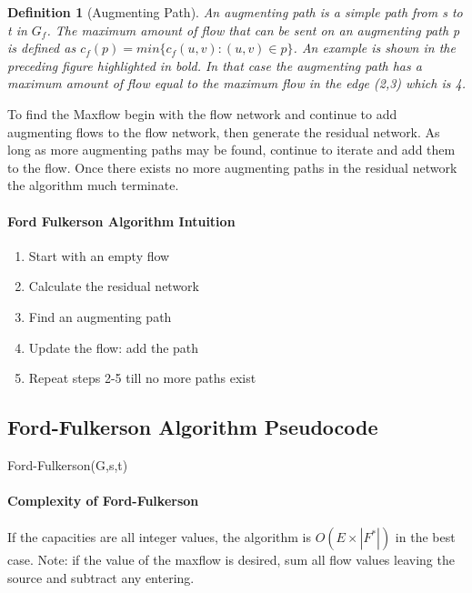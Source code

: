 \documentclass[12pt,letterpaper]{article}
\newtheorem{definition}{Definition}[section]
\begin{document}
\FloatBarrier
\begin{definition}[Augmenting Path]
An augmenting path is a simple path from s to t in $G_f$. The maximum amount of flow that can be sent on an augmenting path p is defined as $c_f(p)=min\{c_f(u,v):(u,v)\in p\}$. An example is shown in the preceding figure highlighted in bold. In that case the augmenting path has a maximum amount of flow equal to the maximum flow in the edge (2,3) which is 4.
\end{definition}
To find the Maxflow begin with the flow network and continue to add augmenting flows to the flow network, then generate the residual network. As long as more augmenting paths may be found, continue to iterate and add them to the flow. Once there exists no more augmenting paths in the residual network the algorithm much terminate. 
\paragraph{Ford Fulkerson Algorithm Intuition}
\begin{enumerate}
\item Start with an empty flow
\item Calculate the residual network
\item Find an augmenting path
\item Update the flow: add the path
\item Repeat steps 2-5 till no more paths exist
\end{enumerate}
\subsection{Ford-Fulkerson Algorithm Pseudocode}
\begin{algorithm}
Ford-Fulkerson(G,s,t)
\end{algorithm}
\paragraph{Complexity of Ford-Fulkerson}
If the capacities are all integer values, the algorithm is $O(E\times|F^*|)$ in the best case. Note: if the value of the maxflow is desired, sum all flow values leaving the source and subtract any entering.
\end{document}
